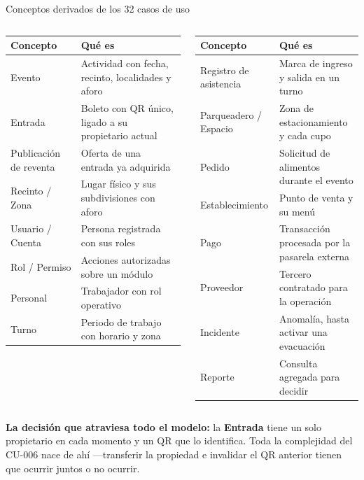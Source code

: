 \documentclass[aspectratio=169,10pt,xcolor={table}]{beamer}
\begin{document}
\begin{frame}{Conceptos derivados de los 32 casos de uso}
  \scriptsize
  \begin{columns}[T]
    \begin{column}{0.5\textwidth}
      \begin{tabular}{L{2.1cm}L{4.4cm}}
        \toprule
        \textbf{Concepto} & \textbf{Qué es} \\
        \midrule
        Evento & Actividad con fecha, recinto, localidades y aforo \\
        Entrada & Boleto con QR único, ligado a su propietario actual \\
        Publicación de reventa & Oferta de una entrada ya adquirida \\
        Recinto / Zona & Lugar físico y sus subdivisiones con aforo \\
        Usuario / Cuenta & Persona registrada con sus roles \\
        Rol / Permiso & Acciones autorizadas sobre un módulo \\
        Personal & Trabajador con rol operativo \\
        Turno & Periodo de trabajo con horario y zona \\
        \bottomrule
      \end{tabular}
    \end{column}
    \begin{column}{0.5\textwidth}
      \begin{tabular}{L{2.3cm}L{4.2cm}}
        \toprule
        \textbf{Concepto} & \textbf{Qué es} \\
        \midrule
        Registro de asistencia & Marca de ingreso y salida en un turno \\
        Parqueadero / Espacio & Zona de estacionamiento y cada cupo \\
        Pedido & Solicitud de alimentos durante el evento \\
        Establecimiento & Punto de venta y su menú \\
        Pago & Transacción procesada por la pasarela externa \\
        Proveedor & Tercero contratado para la operación \\
        Incidente & Anomalía, hasta activar una evacuación \\
        Reporte & Consulta agregada para decidir \\
        \bottomrule
      \end{tabular}
    \end{column}
  \end{columns}

  \vspace{0.6em}
  \footnotesize
  \textbf{La decisión que atraviesa todo el modelo:} la \textbf{Entrada} tiene un solo
  propietario en cada momento y un QR que lo identifica. Toda la complejidad del CU-006 nace de
  ahí ---transferir la propiedad e invalidar el QR anterior tienen que ocurrir juntos o no
  ocurrir.
\end{frame}
\end{document}
